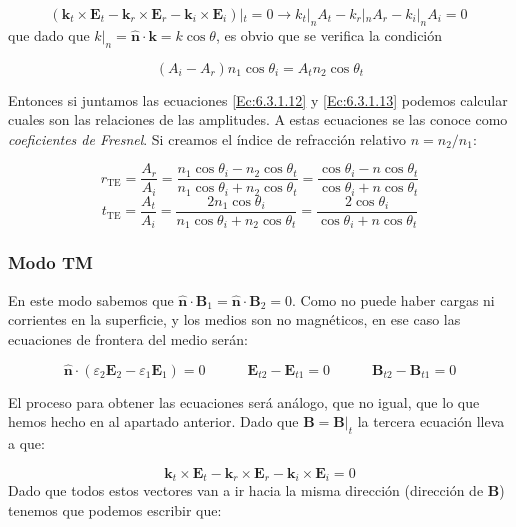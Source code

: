 \documentclass[12pt,a4paper]{article}
\newcommand{\tquad}{\quad \quad \quad}
\newcommand{\Bn}{\mathbf{B}}
\newcommand{\En}{\mathbf{E}}
\newcommand{\kn}{\mathbf{k}}
\newcommand{\hnn}{\hat{\mathbf{n}}}
\numberwithin{equation}{section}
\numberwithin{figure}{section}
\begin{document}
$$
(\kn_t \times \En_t -  \kn_r \times \En_r - \kn_i \times \En_i ) |_t = 0 \longrightarrow k_t |_n A_t - k_r |_n A_r - k_i |_n A_i = 0 \ 
$$
que dado que $k|_n = \hnn \cdot \kn = k \cos \theta$, es obvio que se verifica la condición 

\begin{equation}
(A_i - A_r) n_1 \cos \theta_i = A_t n_2 \cos \theta_t \label{Ec:6.3.1.13} 
\end{equation}

Entonces si juntamos las ecuaciones \ref{Ec:6.3.1.12} y \ref{Ec:6.3.1.13} podemos calcular cuales son las relaciones de las amplitudes. A estas ecuaciones se las conoce como \textit{coeficientes de Fresnel}. Si creamos el índice de refracción relativo $n=n_2 / n_1$: 

\begin{equation}
r_{\mathrm{TE}} = \dfrac{A_r}{A_i} = \dfrac{n_1 \cos \theta_i - n_2 \cos \theta_t}{n_1 \cos \theta_i + n_2 \cos \theta_t} = \dfrac{\cos \theta_i - n \cos \theta_t}{\cos \theta_i + n \cos \theta_t}
\end{equation}
\begin{equation}
t_{\mathrm{TE}} = \dfrac{A_t}{A_i} = \dfrac{ 2 n_1 \cos \theta_i }{n_1 \cos \theta_i + n_2 \cos \theta_t} = \dfrac{2 \cos \theta_i}{ \cos \theta_i + n \cos \theta_t}
\end{equation}

\subsubsection{Modo TM}

En este modo sabemos que $\hnn  \cdot \Bn_1 = \hnn \cdot \Bn_2 = 0$. Como no puede haber cargas ni corrientes en la superficie, y los medios son no magnéticos, en ese caso las ecuaciones de frontera del medio serán:

\begin{equation}
\hnn \cdot (\varepsilon_2 \En_2 - \varepsilon_1 \En_1) = 0 \tquad \En_{t2}-\En_{t1}=0
\tquad \Bn_{t2}  - \Bn_{t1} = 0 
\end{equation}

El proceso para obtener las ecuaciones será análogo, que no igual, que lo que hemos hecho en al apartado anterior. Dado que $\Bn = \Bn |_t$ la tercera ecuación lleva a que:


$$
\kn_t \times \En_t -  \kn_r \times \En_r - \kn_i \times \En_i  = 0
$$
Dado que todos estos vectores van a ir hacia la misma dirección (dirección de $\Bn$) tenemos que podemos escribir que:
\end{document}
